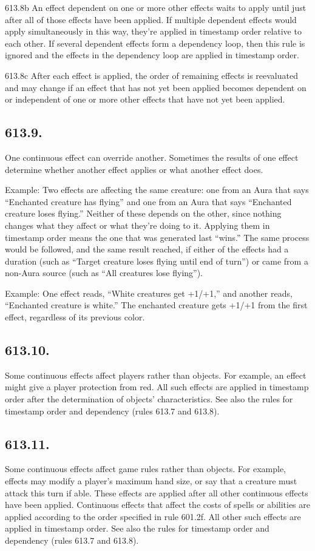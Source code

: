 613.8b An effect dependent on one or more other effects waits to apply until just after all of those effects have been applied. If multiple dependent effects would apply simultaneously in this way, they’re applied in timestamp order relative to each other. If several dependent effects form a dependency loop, then this rule is ignored and the effects in the dependency loop are applied in timestamp order.

613.8c After each effect is applied, the order of remaining effects is reevaluated and may change if an effect that has not yet been applied becomes dependent on or independent of one or more other effects that have not yet been applied.

\subsection*{613.9.}
One continuous effect can override another. Sometimes the results of one effect determine whether another effect applies or what another effect does.

Example: Two effects are affecting the same creature: one from an Aura that says “Enchanted creature has flying” and one from an Aura that says “Enchanted creature loses flying.” Neither of these depends on the other, since nothing changes what they affect or what they’re doing to it. Applying them in timestamp order means the one that was generated last “wins.” The same process would be followed, and the same result reached, if either of the effects had a duration (such as “Target creature loses flying until end of turn”) or came from a non-Aura source (such as “All creatures lose flying”).

Example: One effect reads, “White creatures get +1/+1,” and another reads, “Enchanted creature is white.” The enchanted creature gets +1/+1 from the first effect, regardless of its previous color.

\subsection*{613.10.}
Some continuous effects affect players rather than objects. For example, an effect might give a player protection from red. All such effects are applied in timestamp order after the determination of objects’ characteristics. See also the rules for timestamp order and dependency (rules 613.7 and 613.8).

\subsection*{613.11.}
Some continuous effects affect game rules rather than objects. For example, effects may modify a player’s maximum hand size, or say that a creature must attack this turn if able. These effects are applied after all other continuous effects have been applied. Continuous effects that affect the costs of spells or abilities are applied according to the order specified in rule 601.2f. All other such effects are applied in timestamp order. See also the rules for timestamp order and dependency (rules 613.7 and 613.8).

